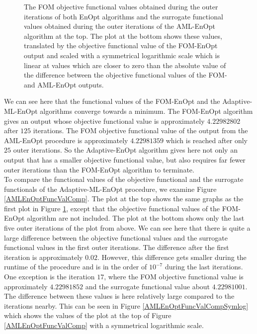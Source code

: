 \begin{figure}
\caption{\label{FOMAMLEnOptFuncValComp}The FOM objective functional values obtained during the outer iterations of both EnOpt algorithms and the surrogate functional values obtained during the outer iterations of the AML-EnOpt algorithm at the top. The plot at the bottom shows these values, translated by the objective functional value of the FOM-EnOpt output and scaled with a symmetrical logarithmic scale which is linear at values which are closer to zero than the absolute value of the difference between the objective functional values of the FOM- and AML-EnOpt outputs.}
\end{figure}

We can see here that the functional values of the FOM-EnOpt and the Adaptive-ML-EnOpt algorithms converge towards a minimum. The FOM-EnOpt algorithm gives an output whose objective functional value is approximately $4.22982802$ after $125$ iterations. The FOM objective functional value of the output from the AML-EnOpt procedure is approximately $4.22981359$ which is reached after only $25$ outer iterations. So the Adaptive-EnOpt algorithm gives here not only an output that has a smaller objective functional value, but also requires far fewer outer iterations than the FOM-EnOpt algorithm to terminate.\\

To compare the functional values of the objective functional and the surrogate functionals of the Adaptive-ML-EnOpt procedure, we examine Figure \ref{AMLEnOptFuncValComp}. The plot at the top shows the same graphs as the first plot in Figure \ref{FOMAMLEnOptFuncValComp}, except that the objective functional values of the FOM-EnOpt algorithm are not included. The plot at the bottom shows only the last five outer iterations of the plot from above. We can see here that there is quite a large difference between the objective functional values and the surrogate functional values in the first outer iterations. The difference after the first iteration is approximately $0.02$. However, this difference gets smaller during the runtime of the procedure and is in the order of $10^{-7}$ during the last iterations. One exception is the iteration $17$, where the FOM objective functional value is approximately $4.22981852$ and the surrogate functional value about $4.22981001$. The difference between these values is here relatively large compared to the iterations nearby. This can be seen in Figure \ref{AMLEnOptFuncValCompSymlog} which shows the values of the plot at the top of Figure \ref{AMLEnOptFuncValComp} with a symmetrical logarithmic scale.


